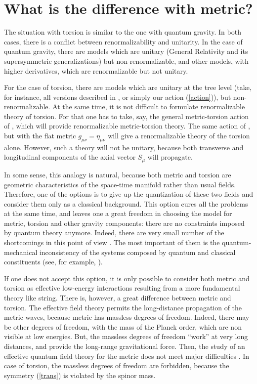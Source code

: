 \section{What is the difference with metric?}

The situation with torsion is similar to the one with quantum 
gravity. In both cases, there is a conflict between renormalizability 
and unitarity. In the case of quantum gravity, there are
models which are unitary (General Relativity and its supersymmetric 
generalizations) but non-renormalizable, and other models, with 
higher derivatives, which are renormalizable but not unitary.  

For the case of torsion, there are models which are unitary 
at the tree level
(take, for instance, all versions described in \cite{sez}, or 
simply our action (\ref{action})), but non-renormalizable. 
At the same time, it is not difficult to formulate 
renormalizable theory of torsion. For that one has to take,
say, the general metric-torsion action of \cite{chris}, which 
will provide renormalizable metric-torsion theory. The same 
action of \cite{chris}, but with the flat metric 
$g_{\mu\nu}=\eta_{\mu\nu}$ will give a renormalizable theory of 
the torsion alone. However, such a theory will not be unitary, 
because both transverse and longitudinal components of the axial 
vector $S_\mu$ will propagate. 

In some sense, this analogy is natural, because both metric
and torsion are geometric characteristics of the space-time
manifold rather than usual fields. Therefore, one of the
options is to give up the quantization of these two
fields and consider them only as a classical background.
This option cures all the problems at the same time, and 
leaves one a great freedom in choosing the model for metric,
torsion and other gravity components: there are no constraints
imposed by quantum theory anymore. Indeed, there are very 
small number of the shortcomings in this point of view 
\cite{susy-enc}. The most important of them is the 
quantum-mechanical inconsistency of the systems composed 
by quantum and classical constituents (see, for example, 
\cite{wald}). 

If one does not accept this option, it is only possible to
consider both metric and torsion as effective low-energy
interactions resulting from a more fundamental theory like
string. There is, however, a great difference between metric 
and torsion. The effective field theory permits the long-distance
propagation of the metric waves, because metric 
has massless degrees of freedom. Indeed, there may be other 
degrees of freedom, with the mass of the Planck order, which 
are non visible at low energies. But, the massless degrees 
of freedom ``work'' at very long distances, and provide 
the long-range gravitational force. Then, the study of an 
effective quantum field theory for the metric
does not meet major difficulties \cite{don,weinberg}. 
In case of torsion, the
massless degrees of freedom are forbidden, because the symmetry 
(\ref{trans}) is violated by the spinor mass. 

